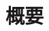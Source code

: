 ﻿\documentclass[../main]{subfiles}
\begin{document}
\chapter*{概要}
\label{abst}

\thispagestyle{empty}
\end{document}
